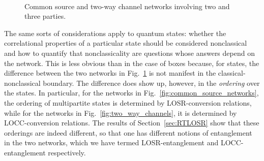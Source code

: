 \documentclass[12pt]{article}
\theoremstyle{plain}
\theoremstyle{definition}
\begin{document}
\begin{figure}[htb]
\centering
    \\
    \caption{Common source and two-way channel networks involving two and three parties.
     }
     \label{fig:common_source_and_two_way}
\end{figure}


The same sorts of considerations apply to quantum states: whether the correlational properties of a particular state should be considered nonclassical and how to quantify that nonclassicality are questions whose answers depend
 on the network.  This is less obvious than in the case of boxes because, for states, the difference between the two networks in Fig.~\ref{fig:common_source_and_two_way}
 is not manifest in the classical-nonclassical boundary.  The difference does show up, however, in the {\em ordering} over the states.
 In particular, for the networks in Fig.~\ref{fig:common_source_networks}, the ordering of multipartite states is determined by LOSR-conversion relations, while for the networks in Fig.~\ref{fig:two_way_channels}, it is determined by LOCC-conversion relations. 
 The results of Section~\ref{sec:RTLOSR} show that these orderings are indeed different, so that one has different notions of entanglement  in the two networks, which we have termed LOSR-entanglement and LOCC-entanglement respectively. 
\end{document}

